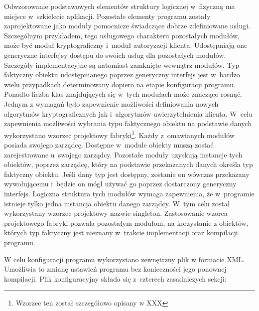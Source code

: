Odwzorowanie podstawowych elementów struktury logicznej w~fizyczną ma
miejsce w~szkielecie aplikacji. Pozostałe elementy programu zostały
zaprojektowane jako moduły pomocnicze świadczące dobrze zdefiniowane
usługi. Szczególnym przykładem, tego usługowego charakteru pozostałych
modułów, może być moduł kryptograficzny i~moduł autoryzacji
klienta. Udostępniają one generyczne interfejsy dostępu do swoich
usług dla pozostałych modułów. Szczegóły implementacyjne są natomiast
zamknięte wewnątrz modułów. Typ faktyczny obiektu udostępnianego
poprzez generyczny interfejs jest w~bardzo wielu przypadkach
determinowany dopiero na etapie konfiguracji programu. Ponadto liczba
klas znajdujących się w~tych modułach może znacząco rosnąć. Jednym z
wymagań było zapewnienie możliwości definiowania nowych algorytmów
kryptograficznych jak i~algorytmów uwierzytelnienia klienta. W~celu
zapewnienia możliwości wybrania typu faktycznego obiektu na podstawie
danych wykorzystano wzorzec projektowy fabryki\footnote{Wzorzec ten
  został szczegółowo opisany w XXX}.  Każdy z~omawianych modułów
posiada swojego zarządcę. Dostępne w~module obiekty muszą zostać
zarejestrowane u~swojego zarządcy. Pozostałe moduły uzyskują instancje
tych obiektów, poprzez zarządcę, który na podstawie przekazanych
danych określa typ faktyczny obiektu. Jeśli dany typ jest dostępny,
zostanie on wówczas przekazany wywołującemu i~będzie on mógł używać go
poprzez dostarczony generyczny interfejs. Logiczna struktura tych
modułów wymaga zapewnienia, że w~programie istnieje tylko jedna
instancja obiektu danego zarządcy. W~tym celu został wykorzystany
wzorzec projektowy nazwie singleton. Zastosowanie wzorca projektowego
fabryki pozwala pozostałym modułom, na korzystanie z obiektów, których
typ faktyczny jest nieznany w~trakcie implementacji oraz kompilacji
programu.

W celu konfiguracji programu wykorzystano zewnętrzny plik w formacie
XML. Umożliwia to zmianę ustawień programu bez konieczności jego
ponownej kompilacji. Plik konfiguracyjny składa się z~czterech
zasadniczych sekcji:

